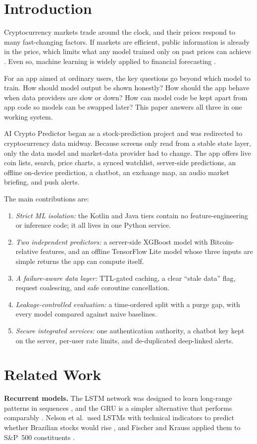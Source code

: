 \documentclass[conference]{IEEEtran}
\begin{document}
\section{Introduction}
Cryptocurrency markets trade around the clock, and their prices respond to many fast-changing factors. If markets are efficient, public information is already in the price, which limits what any model trained only on past prices can achieve \cite{fama1970}. Even so, machine learning is widely applied to financial forecasting \cite{sezer2020}.

For an app aimed at ordinary users, the key questions go beyond which model to train. How should model output be shown honestly? How should the app behave when data providers are slow or down? How can model code be kept apart from app code so models can be swapped later? This paper answers all three in one working system.

AI Crypto Predictor began as a stock-prediction project and was redirected to cryptocurrency data midway. Because screens only read from a stable state layer, only the data model and market-data provider had to change. The app offers live coin lists, search, price charts, a synced watchlist, server-side predictions, an offline on-device prediction, a chatbot, an exchange map, an audio market briefing, and push alerts.

The main contributions are:
\begin{enumerate}
    \item \emph{Strict ML isolation:} the Kotlin and Java tiers contain no feature-engineering or inference code; it all lives in one Python service.
    \item \emph{Two independent predictors:} a server-side XGBoost model with Bitcoin-relative features, and an offline TensorFlow Lite model whose three inputs are simple returns the app can compute itself.
    \item \emph{A failure-aware data layer:} TTL-gated caching, a clear ``stale data'' flag, request coalescing, and safe coroutine cancellation.
    \item \emph{Leakage-controlled evaluation:} a time-ordered split with a purge gap, with every model compared against naive baselines.
    \item \emph{Secure integrated services:} one authentication authority, a chatbot key kept on the server, per-user rate limits, and de-duplicated deep-linked alerts.
\end{enumerate}

\section{Related Work}
\textbf{Recurrent models.} The LSTM network was designed to learn long-range patterns in sequences \cite{hochreiter1997}, and the GRU is a simpler alternative \cite{cho2014} that performs comparably \cite{chung2014}. Nelson et al.\ used LSTMs with technical indicators to predict whether Brazilian stocks would rise \cite{nelson2017}, and Fischer and Krauss applied them to S\&P~500 constituents \cite{fischer2018}.
\end{document}
